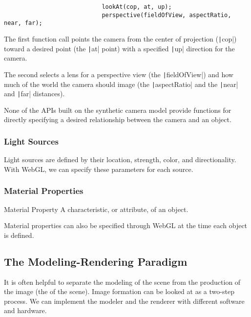 \documentclass[\main/notes.tex]{subfiles}
\begin{document}
					\begin{example}[WebGL Helpful Functions]
						\vspace{-1em}
						\begin{verbatim}
							lookAt(cop, at, up);
							perspective(fieldOfView, aspectRatio, near, far);
						\end{verbatim}
						\vspace{-3em}

						The first function call points the camera from the center of projection
						(\texttt|cop|)
						toward a desired point
						(the \texttt|at| point)
						with a specified \texttt|up| direction for the camera.

						The second selects a lens for a perspective view
						(the \texttt|fieldOfView|)
						and how much of the world the camera should image
						(the \texttt|aspectRatio| and the \texttt|near| and
						\texttt|far| distances).
					\end{example}

					None of the APIs built on the synthetic camera model provide functions
					for directly specifying a desired relationship between the camera and an object.

				\subsubsection{Light Sources}
					Light sources are defined by their location, strength, color, and directionality.
					With WebGL, we can specify these parameters for each source.

				\subsubsection{Material Properties}
					\begin{definition}{Material Property}
						A characteristic, or attribute, of an object.
					\end{definition}

					Material properties can also be specified through WebGL
					at the time each object is defined.

			\subsection{The Modeling-Rendering Paradigm}
				It is often helpful to separate the modeling of the scene
				from the production of the image
				(the  of the scene).
				Image formation can be looked at as a two-step process.
				We can implement the modeler and the renderer with different software and hardware.
\end{document}
